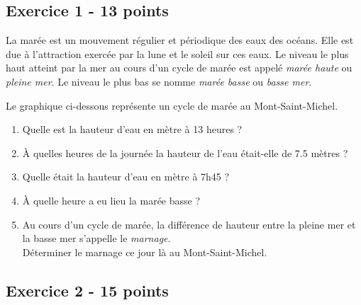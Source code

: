 \subsection*{Exercice 1 - 13 points}

La marée est un mouvement régulier et périodique des eaux des océans. Elle est due à l'attraction exercée par la lune et le soleil sur ces eaux. Le niveau le plus haut atteint par la mer au cours d'un cycle de marée est appelé \textit{marée haute} ou \textit{pleine mer}. Le niveau le plus bas se nomme \textit{marée basse} ou \textit{basse mer}.

Le graphique ci-dessous représente un cycle de marée au Mont-Saint-Michel.

\begin{center}
\end{center}

\begin{enumerate}
    \item Quelle est la hauteur d'eau en mètre à 13 heures ?
    \item À quelles heures de la journée la hauteur de l'eau était-elle de 7.5 mètres ?
    \item Quelle était la hauteur d'eau en mètre à 7h45 ?
    \item À quelle heure a eu lieu la marée basse ?
    \item Au cours d'un cycle de marée, la différence de hauteur entre la pleine mer et la basse mer s'appelle le \textit{marnage}. \\
    Déterminer le marnage ce jour là au Mont-Saint-Michel.
\end{enumerate}

\subsection*{Exercice 2 - 15 points}


